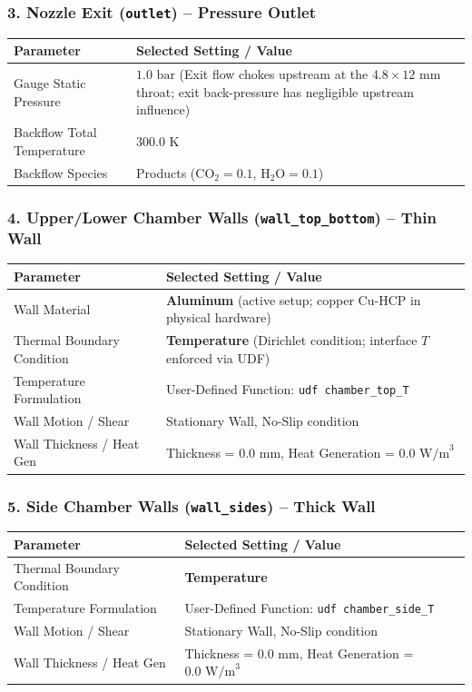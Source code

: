 \documentclass[11pt,a4paper]{article}
\begin{document}
\subsubsection*{3. Nozzle Exit (\texttt{outlet}) -- Pressure Outlet}

\begin{tabularx}{\textwidth}{L{4.5cm} Y}
\toprule
\textbf{Parameter} & \textbf{Selected Setting / Value} \\
\midrule
Gauge Static Pressure & $1.0\text{ bar}$ (Exit flow chokes upstream at the $4.8\times 12\text{ mm}$ throat; exit back-pressure has negligible upstream influence) \\
Backflow Total Temperature & $300.0\text{ K}$ \\
Backflow Species & Products ($\text{CO}_2 = 0.1$, $\text{H}_2\text{O} = 0.1$) \\
\bottomrule
\end{tabularx}

\subsubsection*{4. Upper/Lower Chamber Walls (\texttt{wall\_top\_bottom}) -- Thin Wall}

\begin{tabularx}{\textwidth}{L{4.5cm} Y}
\toprule
\textbf{Parameter} & \textbf{Selected Setting / Value} \\
\midrule
Wall Material & \textbf{Aluminum} (active setup; copper Cu-HCP in physical hardware) \\
Thermal Boundary Condition & \textbf{Temperature} (Dirichlet condition; interface $T$ enforced via UDF) \\
Temperature Formulation & User-Defined Function: \texttt{udf chamber\_top\_T} \\
Wall Motion / Shear & Stationary Wall, No-Slip condition \\
Wall Thickness / Heat Gen & Thickness = $0.0\text{ mm}$, Heat Generation = $0.0\text{ W/m}^3$ \\
\bottomrule
\end{tabularx}

\subsubsection*{5. Side Chamber Walls (\texttt{wall\_sides}) -- Thick Wall}

\begin{tabularx}{\textwidth}{L{4.5cm} Y}
\toprule
\textbf{Parameter} & \textbf{Selected Setting / Value} \\
\midrule
Thermal Boundary Condition & \textbf{Temperature} \\
Temperature Formulation & User-Defined Function: \texttt{udf chamber\_side\_T} \\
Wall Motion / Shear & Stationary Wall, No-Slip condition \\
Wall Thickness / Heat Gen & Thickness = $0.0\text{ mm}$, Heat Generation = $0.0\text{ W/m}^3$ \\
\bottomrule
\end{tabularx}
\end{document}
